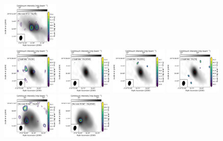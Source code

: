 \begin{figure}[htbp!]
  \includegraphics[width=0.24\textwidth]{./moment0/Set1_ID03_CH3CN_257527.pdf}
  \\
  \includegraphics[width=0.24\textwidth]{./moment0/Set1_ID00_CH3OH_243915.pdf}
  \includegraphics[width=0.24\textwidth]{./moment0/Set1_ID00_CH3OCHO_259342.pdf}
  \includegraphics[width=0.24\textwidth]{./moment0/Set1_ID00_CH3OCH3_259311.pdf}
  \includegraphics[width=0.24\textwidth]{./moment0/Set1_ID00_CH3CN_257527.pdf}
  \\
  \includegraphics[width=0.24\textwidth]{./moment0/Set1_ID01_4_CH3OH_243915.pdf}
  \includegraphics[width=0.24\textwidth]{./moment0/Set1_ID01_4_CH3OCHO_259342.pdf}

\end{figure}

